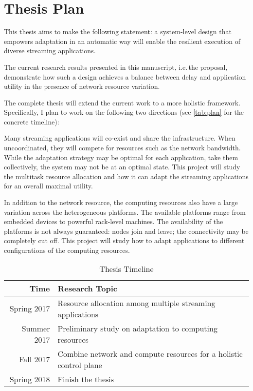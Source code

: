 \chapter{Thesis Plan}
\label{cha:thesis-plan}

This thesis aims to make the following statement: a system-level design that
empowers adaptation in an automatic way will enable the resilient execution of
diverse streaming applications.

The current research results presented in this manuscript, i.e.\,the proposal,
demonstrate how such a design achieves a balance between delay and application
utility in the presence of network resource variation.

The complete thesis will extend the current work to a more holistic framework.
Specifically, I plan to work on the following two directions (see
\autoref{tab:plan} for the concrete timeline):

 Many streaming applications will co-exist
and share the infrastructure. When uncoordinated, they will compete for
resources such as the network bandwidth. While the adaptation strategy may be
optimal for each application, take them collectively, the system may not be at
an optimal state. This project will study the multitask resource allocation and
how it can adapt the streaming applications for an overall maximal utility.

 In addition to the network resource,
the computing resources also have a large variation across the heterogeneous
platforms. The available platforms range from embedded devices to powerful
rack-level machines. The availability of the platforms is not always guaranteed:
nodes join and leave; the connectivity may be completely cut off. This project
will study how to adapt applications to different configurations of the
computing resources.

\vspace{1.5em}
\begin{table}[h]
  \normalsize
  \centering
  \begin{tabular}{r l}
    \toprule
    \textbf{Time} & \textbf{Research Topic} \\
    \midrule
    Spring 2017 & Resource allocation among multiple streaming applications \\
    Summer 2017 & Preliminary study on adaptation to computing resources \\
    Fall 2017 & Combine network and compute resources for a holistic control plane \\
    Spring 2018 &  Finish the thesis \\
    \bottomrule
  \end{tabular}
  \caption{Thesis Timeline}
  \label{tab:plan}
\end{table}

